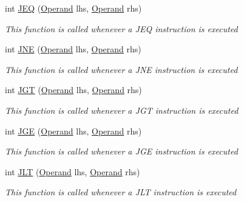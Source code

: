 \begin{DoxyCompactItemize}
int \hyperlink{class_c_p_u___o_s___simulator_1_1_c_p_u_1_1_instruction_a4b8c21ddee6ae28e5c7dcfe4ed83e5b0}{J\+E\+Q} (\hyperlink{class_c_p_u___o_s___simulator_1_1_c_p_u_1_1_operand}{Operand} lhs, \hyperlink{class_c_p_u___o_s___simulator_1_1_c_p_u_1_1_operand}{Operand} rhs)
\begin{DoxyCompactList}\small\item\em This function is called whenever a J\+E\+Q instruction is executed \end{DoxyCompactList}\item 
int \hyperlink{class_c_p_u___o_s___simulator_1_1_c_p_u_1_1_instruction_aacc7e6dcc303f8bad362559bcda3b4f8}{J\+N\+E} (\hyperlink{class_c_p_u___o_s___simulator_1_1_c_p_u_1_1_operand}{Operand} lhs, \hyperlink{class_c_p_u___o_s___simulator_1_1_c_p_u_1_1_operand}{Operand} rhs)
\begin{DoxyCompactList}\small\item\em This function is called whenever a J\+N\+E instruction is executed \end{DoxyCompactList}\item 
int \hyperlink{class_c_p_u___o_s___simulator_1_1_c_p_u_1_1_instruction_a40005a411c3cdaad9c59d93f11df0b34}{J\+G\+T} (\hyperlink{class_c_p_u___o_s___simulator_1_1_c_p_u_1_1_operand}{Operand} lhs, \hyperlink{class_c_p_u___o_s___simulator_1_1_c_p_u_1_1_operand}{Operand} rhs)
\begin{DoxyCompactList}\small\item\em This function is called whenever a J\+G\+T instruction is executed \end{DoxyCompactList}\item 
int \hyperlink{class_c_p_u___o_s___simulator_1_1_c_p_u_1_1_instruction_ab9afe42e5248b90dcb8c93bdc738480d}{J\+G\+E} (\hyperlink{class_c_p_u___o_s___simulator_1_1_c_p_u_1_1_operand}{Operand} lhs, \hyperlink{class_c_p_u___o_s___simulator_1_1_c_p_u_1_1_operand}{Operand} rhs)
\begin{DoxyCompactList}\small\item\em This function is called whenever a J\+G\+E instruction is executed \end{DoxyCompactList}\item 
int \hyperlink{class_c_p_u___o_s___simulator_1_1_c_p_u_1_1_instruction_a9604e15da40e3e59f6c50902b7abb288}{J\+L\+T} (\hyperlink{class_c_p_u___o_s___simulator_1_1_c_p_u_1_1_operand}{Operand} lhs, \hyperlink{class_c_p_u___o_s___simulator_1_1_c_p_u_1_1_operand}{Operand} rhs)
\begin{DoxyCompactList}\small\item\em This function is called whenever a J\+L\+T instruction is executed \end{DoxyCompactList}\item 

\end{DoxyCompactItemize}

